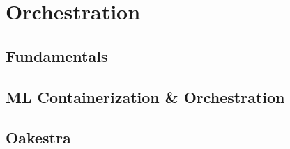 


\section{Orchestration}

\subsection{Fundamentals}

\subsection{ML Containerization \& Orchestration}



\subsection{Oakestra}

